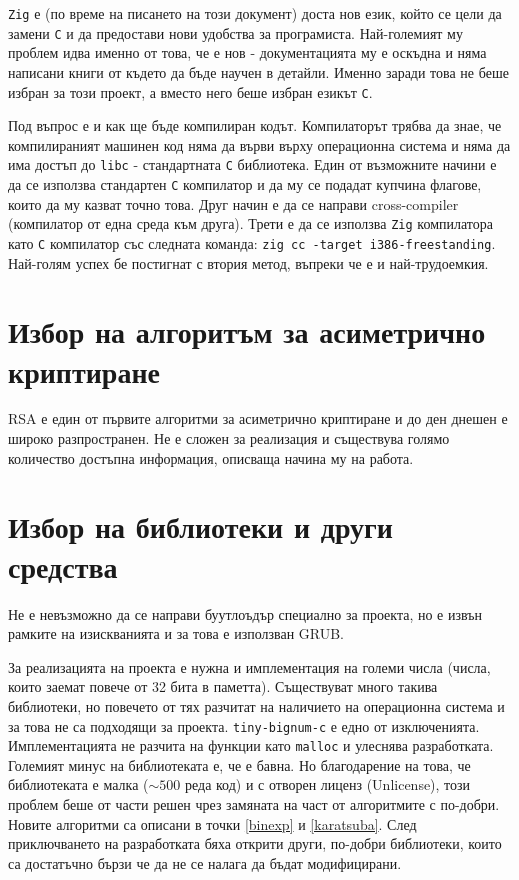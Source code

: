 {\tt Zig} е (по време на писането на този документ) доста нов език, който се цели да замени {\tt C} и да предостави нови удобства за програмиста.\cite{whyzig} Най-големият му проблем идва именно от това, че е нов - документацията му е оскъдна и няма написани книги от където да бъде научен в детайли. Именно заради това не беше избран за този проект, а вместо него беше избран езикът {\tt C}.

Под въпрос е и как ще бъде компилиран кодът. Компилаторът трябва да знае, че компилираният машинен код няма да върви върху операционна система и няма да има достъп до {\tt libc} - стандартната {\tt C} библиотека. Един от възможните начини е да се използва стандартен {\tt C} компилатор и да му се подадат купчина флагове, които да му казват точно това. Друг начин е да се направи cross-compiler (компилатор от една среда към друга). Трети е да се използва {\tt Zig} компилатора като {\tt C} компилатор със следната команда:
{\tt zig cc -target i386-freestanding}.
Най-голям успех бе постигнат с втория метод, въпреки че е и най-трудоемкия.

\section{Избор на алгоритъм за асиметрично криптиране}
RSA е един от първите алгоритми за асиметрично криптиране и до ден днешен е широко разпространен. Не е сложен за реализация и съществува голямо количество достъпна информация, описваща начина му на работа.\cite{artoftheproblemrsa, rsapaper}

\section{Избор на библиотеки и други средства}
Не е невъзможно да се направи буутлоъдър специално за проекта, но е извън рамките на изискванията и за това е използван GRUB.

За реализацията на проекта е нужна и имплементация на големи числа (числа, които заемат повече от 32 бита в паметта). Съществуват много такива библиотеки, но повечето от тях разчитат на наличието на операционна система и за това не са подходящи за проекта. {\tt tiny-bignum-c}\cite{tinybignumc} е едно от изключенията. Имплементацията не разчита на функции като {\tt malloc} и улеснява разработката. Големият минус на библиотеката е, че е бавна. Но благодарение на това, че библиотеката е малка ($\sim 500$ реда код) и с отворен лиценз (Unlicense), този проблем беше от части решен чрез замяната на част от алгоритмите с по-добри. Новите алгоритми са описани в точки \ref{binexp} и \ref{karatsuba}. След приключването на разработката бяха открити други, по-добри библиотеки\cite{tomsfastmath, bignum-embedded}, които са достатъчно бързи че да не се налага да бъдат модифицирани.

